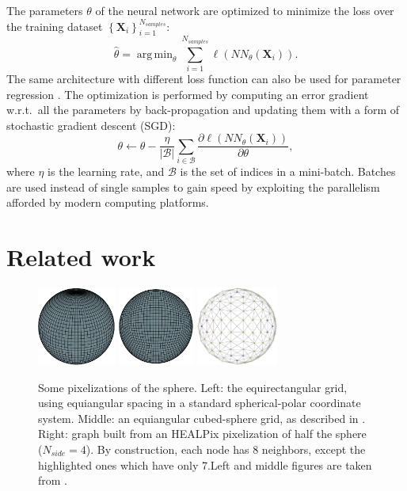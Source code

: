 \documentclass[final,twocolumn,3p,times,authoryear]{elsarticle}
\renewcommand{\b}[1]{{\bm{#1}}}   %
\newcommand{\1}{\b{1}}              %
\newcommand{\0}{\b{0}}              %
\newcommand{\B}{\mathcal{B}}
\newcommand{\X}{\b{X}}
\DeclareMathOperator*{\argmin}{arg \, min}
\begin{document}
The parameters $\theta$ of the neural network are optimized to minimize the loss over the training dataset $\left\{ \X_i \right\}_{i=1}^{N_{samples}}$:
\begin{equation*}
	\hat{\theta} = \argmin_\theta \sum_{i=1}^{N_{samples}} \ell(NN_\theta(\X_i)).
\end{equation*}
The same architecture with different loss function can also be used for parameter regression \citep{fluri2018deep,gupta2018nongaussianinformation}.
The optimization is performed by computing an error gradient w.r.t.\ all the parameters by back-propagation and updating them with a form of stochastic gradient descent (SGD):
\begin{equation*}
	\theta \leftarrow \theta - \frac{\eta}{|\B|} \sum_{i \in \B} \frac{\partial \ell(NN_\theta(\X_i))}{\partial \theta} ,
\end{equation*}
where $\eta$ is the learning rate, and $\B$ is the set of indices in a mini-batch. Batches are used instead of single samples to gain speed by exploiting the parallelism afforded by modern computing platforms.


\section{Related work}
\label{sec:related}

\begin{figure}
    \centering
    \includegraphics[height=7em]{sphere_grid_equirectangular}
    \hfill
    \includegraphics[height=7em]{sphere_grid_cubedsphere}
    \hfill
    \includegraphics[height=7em]{half_graph_4}
    \caption[]{Some pixelizations of the sphere. Left: the equirectangular grid, using equiangular spacing in a standard spherical-polar coordinate system. Middle: an equiangular cubed-sphere grid, as described in \citet{ronchi1996cubed}. Right: graph built from an HEALPix pixelization of half the sphere ($N_{side} = 4$). By construction, each node has 8 neighbors, except the highlighted ones which have only 7.\footnotemark[7] Left and middle figures are taken from \citet{boomsma2017spherical}.}
    \label{fig:sphere_grids}
    \label{fig:healpix_graph_4}
\end{figure}
\end{document}
